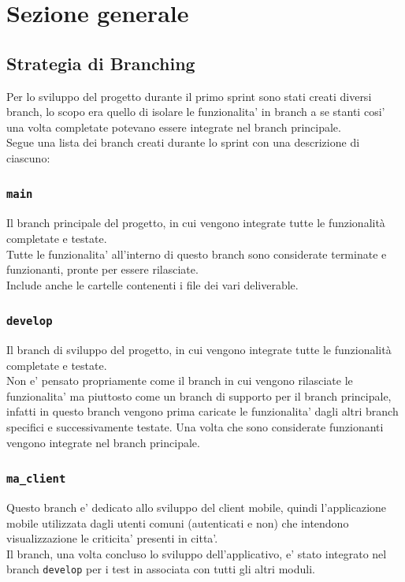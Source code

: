 \documentclass{article}
\begin{document}
\clearpage

\section{Sezione generale}

\subsection{Strategia di Branching}

Per lo sviluppo del progetto durante il primo sprint sono stati creati diversi branch, lo scopo era quello di isolare le funzionalita' in branch a se stanti cosi' una volta completate potevano essere integrate nel branch principale.\\
Segue una lista dei branch creati durante lo sprint con una descrizione di ciascuno:

\subsubsection{\texttt{main}}
Il branch principale del progetto, in cui vengono integrate tutte le funzionalità completate e testate.\\
Tutte le funzionalita' all'interno di questo branch sono considerate terminate e funzionanti, pronte per essere rilasciate.\\
Include anche le cartelle contenenti i file dei vari deliverable.

\subsubsection{\texttt{develop}}
Il branch di sviluppo del progetto, in cui vengono integrate tutte le funzionalità completate e testate.\\
Non e' pensato propriamente come il branch in cui vengono rilasciate le funzionalita' ma piuttosto come un branch di supporto per il branch principale, infatti in questo branch vengono prima caricate le funzionalita' dagli altri branch specifici e successivamente testate. Una volta che sono considerate funzionanti vengono integrate nel branch principale.

\subsubsection{\texttt{ma\_client}}

Questo branch e' dedicato allo sviluppo del client mobile, quindi l'applicazione mobile utilizzata dagli utenti comuni (autenticati e non) che intendono visualizzazione le criticita' presenti in citta'.\\
Il branch, una volta concluso lo sviluppo dell'applicativo, e' stato integrato nel branch \texttt{develop} per i test in associata con tutti gli altri moduli.
\end{document}
